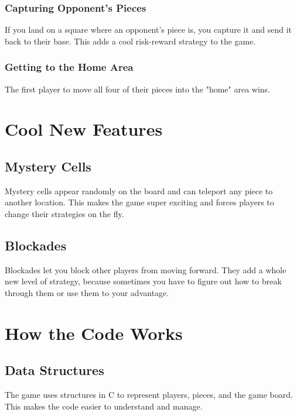 \documentclass[12pt]{article}
\begin{document}
\subsubsection{Capturing Opponent's Pieces}
If you land on a square where an opponent's piece is, you capture it and send it back to their base. This adds a cool risk-reward strategy to the game.

\subsubsection{Getting to the Home Area}
The first player to move all four of their pieces into the "home" area wins.

\section{Cool New Features}
\subsection{Mystery Cells}
Mystery cells appear randomly on the board and can teleport any piece to another location. This makes the game super exciting and forces players to change their strategies on the fly.

\subsection{Blockades}
Blockades let you block other players from moving forward. They add a whole new level of strategy, because sometimes you have to figure out how to break through them or use them to your advantage.

\section{How the Code Works}
\subsection{Data Structures}
The game uses structures in C to represent players, pieces, and the game board. This makes the code easier to understand and manage.
\end{document}

